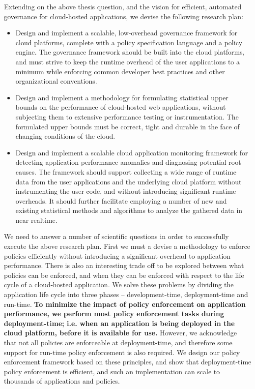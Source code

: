 Extending on the above thesis question, and the vision for efficient, automated governance for
cloud-hosted applications, we devise the following research plan:

\begin{itemize}
\item Design and implement a scalable, low-overhead governance framework for cloud platforms,
complete with a policy specification language and a policy engine. The governance framework should be
built into the cloud platforms, and must
strive to keep the runtime overhead of the user applications to a minimum while enforcing
common developer best practices and other organizational conventions.
\item Design and implement a methodology for formulating statistical upper bounds on the
performance of cloud-hosted web applications, without
 subjecting them to extensive performance testing or instrumentation. The formulated
upper bounds must be correct, tight and durable in the face of changing
 conditions of the cloud.
 \item Design and implement a scalable cloud application monitoring framework for detecting
application performance anomalies and diagnosing potential root causes. 
The framework should support collecting
 a wide range of runtime data from the user applications and the underlying cloud platform
 without instrumenting the user code, and without introducing significant runtime overheads.
 It should further facilitate employing a number of new and existing statistical methods
 and algorithms to analyze the gathered data in near realtime.
\end{itemize}

We need to answer a number of scientific questions in order to successfully execute the 
above research plan. First we must a devise a methodology to enforce policies efficiently
without introducing a significant overhead to application performance. There is also an interesting
trade off to be explored between what policies can be enforced, and when they can be enforced with respect
to the life cycle of a cloud-hosted application. We solve these problems by dividing the application
life cycle into three phases -- development-time, deployment-time and run-time. \textbf{To minimize the
impact of policy enforcement on application performance, we perform most policy
enforcement tasks during deployment-time; i.e. when an application is being deployed in the 
cloud platform, before it is available for use.} However, we acknowledge that not all policies
are enforceable at deployment-time, and therefore some support for run-time policy enforcement
is also required. We design our policy enforcement framework based on these principles, and 
show that deployment-time policy enforcement is efficient, and such an implementation can scale
to thousands of applications and policies.

